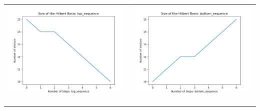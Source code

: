 \documentclass[10pt]{article}
\begin{document}
\begin{tabular}{c|c}
\begin{minipage}{.45\textwidth}
\includegraphics[width=\textwidth]{"DATA/5d/6 generators 1 bound I/top_sequence SIZE"}
\end{minipage} &
\begin{minipage}{.45\textwidth}
\includegraphics[width=\textwidth]{"DATA/5d/6 generators 1 bound I bottomup/bottom_sequence SIZE"}
\end{minipage} \\ \\
\hline \\\begin{minipage}{.45\textwidth}

\end{minipage}
\end{tabular}
\end{document}
